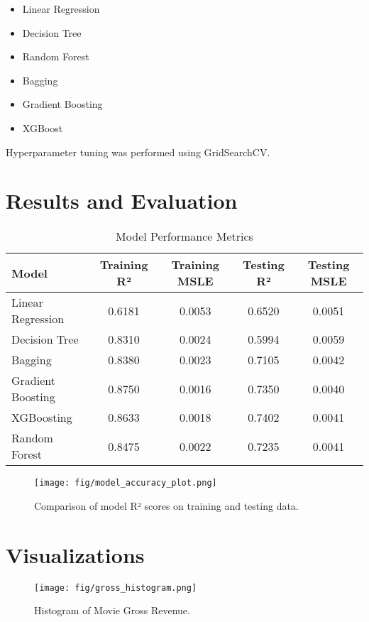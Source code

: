 \documentclass[a4paper,12pt]{article}
\begin{document}
\begin{itemize}
  \item Linear Regression
  \item Decision Tree
  \item Random Forest
  \item Bagging
  \item Gradient Boosting
  \item XGBoost
\end{itemize}

Hyperparameter tuning was performed using GridSearchCV.

\section{Results and Evaluation}

\begin{table}[H]
\centering
\caption{Model Performance Metrics}
\begin{tabular}{lcccc}
\toprule
Model & Training R² & Training MSLE & Testing R² & Testing MSLE \\
\midrule
Linear Regression & 0.6181 & 0.0053 & 0.6520 & 0.0051 \\
Decision Tree & 0.8310 & 0.0024 & 0.5994 & 0.0059 \\
Bagging & 0.8380 & 0.0023 & 0.7105 & 0.0042 \\
Gradient Boosting & 0.8750 & 0.0016 & 0.7350 & 0.0040 \\
XGBoosting & 0.8633 & 0.0018 & 0.7402 & 0.0041 \\
Random Forest & 0.8475 & 0.0022 & 0.7235 & 0.0041 \\
\bottomrule
\end{tabular}
\end{table}

\begin{figure}[H]
\centering
\texttt{[image: fig/model\_accuracy\_plot.png]}
\caption{Comparison of model R² scores on training and testing data.}
\label{fig:model_accuracy}
\end{figure}

\section{Visualizations}

\begin{figure}[H]
\centering
\texttt{[image: fig/gross\_histogram.png]}
\caption{Histogram of Movie Gross Revenue.}
\label{fig:gross_histogram}
\end{figure}
\end{document}
